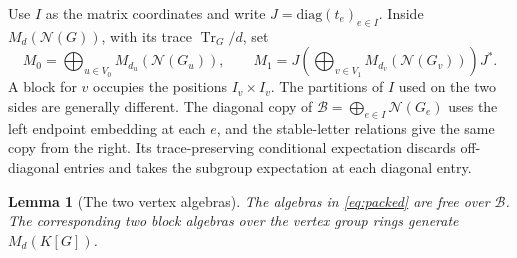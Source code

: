 \documentclass[11pt,a4paper,reqno]{amsart}
\numberwithin{equation}{section}
\newtheorem{lemma}[theorem]{Lemma}
\theoremstyle{remark}
\newcommand{\N}{\mathcal N}
\newcommand{\Tr}{\operatorname{Tr}}
\begin{document}
Use \(I\) as the matrix coordinates and write \(J=\mathrm{diag}(t_e)_{e\in I}\). Inside \(M_d(\N(G))\), with its trace \(\Tr_G/d\), set
\begin{equation}\label{eq:packed}
 M_0=\bigoplus_{u\in V_0}M_{d_u}(\N(G_u)),\qquad
 M_1=J\left(\bigoplus_{v\in V_1}M_{d_v}(\N(G_v))\right)J^* .
\end{equation}
A block for \(v\) occupies the positions \(I_v\times I_v\). The partitions of \(I\) used on the two sides are generally different. The diagonal copy of
\(\mathcal B=\bigoplus_{e\in I}\N(G_e)\) uses the left endpoint embedding at each \(e\), and the stable-letter relations give the same copy from the right. Its trace-preserving conditional expectation discards off-diagonal entries and takes the subgroup expectation at each diagonal entry.

\begin{lemma}[The two vertex algebras]\label{lem:packing}
The algebras in \eqref{eq:packed} are free over \(\mathcal B\). The corresponding two block algebras over the vertex group rings generate \(M_d(K[G])\).
\end{lemma}
\end{document}
